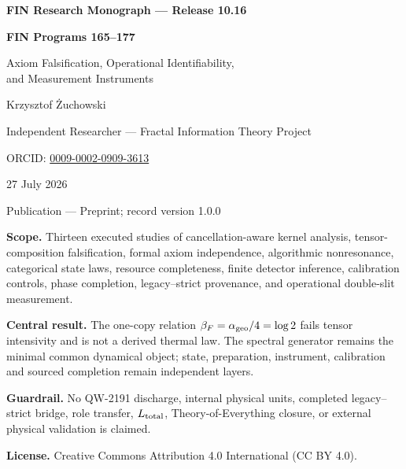 \documentclass[11pt,a4paper,openany]{report}
\begin{document}
\hypersetup{pageanchor=false}
\begin{titlepage}
\centering
\vspace*{8mm}
{\Large\bfseries FIN Research Monograph --- Release 10.16\par}
\vspace{10mm}
{\Huge\bfseries FIN Programs 165--177\par}
\vspace{6mm}
{\Large Axiom Falsification, Operational Identifiability,\\
and Measurement Instruments\par}
\vspace{16mm}
{\Large Krzysztof \.Zuchowski\par}
\vspace{2mm}
{\normalsize Independent Researcher --- Fractal Information Theory Project\par}
\vspace{2mm}
{\normalsize ORCID: \href{https://orcid.org/0009-0002-0909-3613}{0009-0002-0909-3613}\par}
\vspace{10mm}
{\large 27 July 2026\par}
{\normalsize Publication --- Preprint; record version 1.0.0\par}
\vfill
\begin{minipage}{0.88\textwidth}
\small
\textbf{Scope.} Thirteen executed studies of cancellation-aware kernel
analysis, tensor-composition falsification, formal axiom independence,
algorithmic nonresonance, categorical state laws, resource completeness,
finite detector inference, calibration controls, phase completion,
legacy--strict provenance, and operational double-slit measurement.

\medskip
\textbf{Central result.} The one-copy relation
\(\beta_F=\alpha_{\rm geo}/4=\log2\) fails tensor intensivity and is not a
derived thermal law. The spectral generator remains the minimal common
dynamical object; state, preparation, instrument, calibration and sourced
completion remain independent layers.

\medskip
\textbf{Guardrail.} No QW-2191 discharge, internal physical units, completed
legacy--strict bridge, role transfer, \(L_{\rm total}\), Theory-of-Everything
closure, or external physical validation is claimed.

\medskip
\textbf{License.} Creative Commons Attribution 4.0 International (CC BY 4.0).
\end{minipage}
\vfill
\end{titlepage}
\hypersetup{pageanchor=true}
\end{document}
